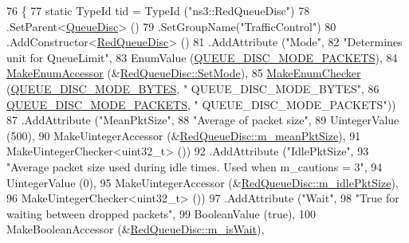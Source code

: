 \begin{DoxyCode}
76 \{
77   \textcolor{keyword}{static} TypeId tid = TypeId (\textcolor{stringliteral}{"ns3::RedQueueDisc"})
78     .SetParent<\hyperlink{classns3_1_1QueueDisc_a0e328ad3196b7d16783b8680722381d6}{QueueDisc}> ()
79     .SetGroupName(\textcolor{stringliteral}{"TrafficControl"})
80     .AddConstructor<\hyperlink{classns3_1_1RedQueueDisc_a0173a0792bb22425223a1d2dba185a6f}{RedQueueDisc}> ()
81     .AddAttribute (\textcolor{stringliteral}{"Mode"},
82                    \textcolor{stringliteral}{"Determines unit for QueueLimit"},
83                    EnumValue (\hyperlink{classns3_1_1RedQueueDisc_addca87c9127669da12f19adfe7d14a30a116c76aa54c1388fc5c2d75cebf577d3}{QUEUE\_DISC\_MODE\_PACKETS}),
84                    \hyperlink{namespacens3_af5050739867ce63896dec011e332c8ec}{MakeEnumAccessor} (&\hyperlink{classns3_1_1RedQueueDisc_ac87e3eb66b4e47593dde63a4638ad02f}{RedQueueDisc::SetMode}),
85                    \hyperlink{namespacens3_a48832781a2b521d3d0091e05ece30615}{MakeEnumChecker} (\hyperlink{classns3_1_1RedQueueDisc_addca87c9127669da12f19adfe7d14a30a2f30850f8c1dcf5ee511e65d810031e8}{QUEUE\_DISC\_MODE\_BYTES}, \textcolor{stringliteral}{"
      QUEUE\_DISC\_MODE\_BYTES"},
86                                     \hyperlink{classns3_1_1RedQueueDisc_addca87c9127669da12f19adfe7d14a30a116c76aa54c1388fc5c2d75cebf577d3}{QUEUE\_DISC\_MODE\_PACKETS}, \textcolor{stringliteral}{"
      QUEUE\_DISC\_MODE\_PACKETS"}))
87     .AddAttribute (\textcolor{stringliteral}{"MeanPktSize"},
88                    \textcolor{stringliteral}{"Average of packet size"},
89                    UintegerValue (500),
90                    MakeUintegerAccessor (&\hyperlink{classns3_1_1RedQueueDisc_a70edac67edac4ce7c4a7d4325cf1e409}{RedQueueDisc::m\_meanPktSize}),
91                    MakeUintegerChecker<uint32\_t> ())
92     .AddAttribute (\textcolor{stringliteral}{"IdlePktSize"},
93                    \textcolor{stringliteral}{"Average packet size used during idle times. Used when m\_cautions = 3"},
94                    UintegerValue (0),
95                    MakeUintegerAccessor (&\hyperlink{classns3_1_1RedQueueDisc_ae09362adeaa13f9612b39dc7d76ed2cd}{RedQueueDisc::m\_idlePktSize}),
96                    MakeUintegerChecker<uint32\_t> ())
97     .AddAttribute (\textcolor{stringliteral}{"Wait"},
98                    \textcolor{stringliteral}{"True for waiting between dropped packets"},
99                    BooleanValue (\textcolor{keyword}{true}),
100                    MakeBooleanAccessor (&\hyperlink{classns3_1_1RedQueueDisc_a581b90ab14e1387a63b11dd7d03a3e00}{RedQueueDisc::m\_isWait}),

\end{DoxyCode}
